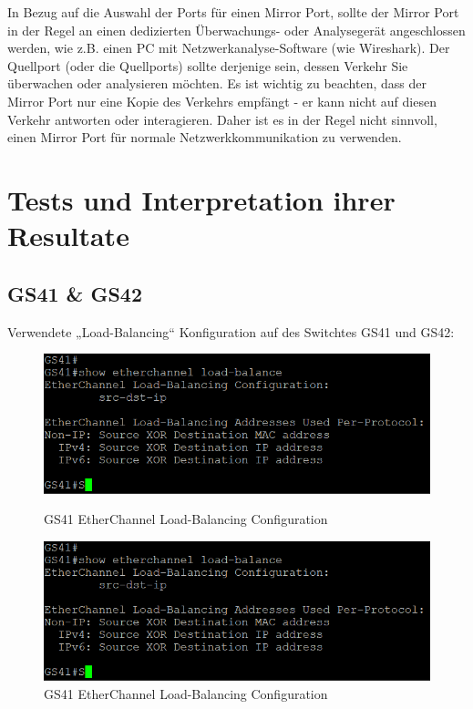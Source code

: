 \documentclass{article}
\begin{document}
\noindent In Bezug auf die Auswahl der Ports für einen Mirror Port, sollte der Mirror Port in der Regel an einen dedizierten Überwachungs- oder Analysegerät angeschlossen werden, wie z.B. einen PC mit Netzwerkanalyse-Software (wie Wireshark). Der Quellport (oder die Quellports) sollte derjenige sein, dessen Verkehr Sie überwachen oder analysieren möchten. Es ist wichtig zu beachten, dass der Mirror Port nur eine Kopie des Verkehrs empfängt - er kann nicht auf diesen Verkehr antworten oder interagieren. Daher ist es in der Regel nicht sinnvoll, einen Mirror Port für normale Netzwerkkommunikation zu verwenden.\\

\pagebreak
\section{Tests und Interpretation ihrer Resultate}

\subsection{GS41 \& GS42}
Verwendete „Load-Balancing“ Konfiguration auf des Switchtes GS41 und GS42:\\
\begin{figure}[!htp]
  \centering
  \begin{minipage}[b]{0.45\textwidth}
    \includegraphics[width=\textwidth]{Arbeitsergebnisse/GS41/GS41_etherchannel.png}
    \caption{GS41 EtherChannel Load-Balancing Configuration}
  \end{minipage}
  \hspace{0.8cm}
  \begin{minipage}[b]{0.45\textwidth}
    \includegraphics[width=\textwidth]{Arbeitsergebnisse/GS41/GS41_etherchannel.png}
    \caption{GS41 EtherChannel Load-Balancing Configuration}
  \end{minipage}
\end{figure}
\end{document}
